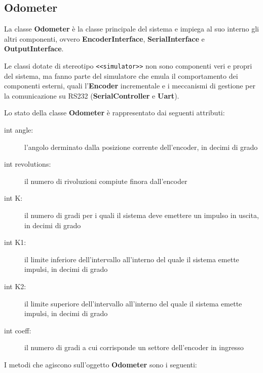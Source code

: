 \documentclass [11pt,a4paper,oneside]{paper}
\newcommand{\component}[1]{\textbf{#1}}
\newcommand{\identifier}[1]{\texttt{#1}}
\begin{document}
\subsection{Odometer}
La classe \component{Odometer} è la classe principale del sistema e
impiega al suo interno gli altri componenti, ovvero 
\component{EncoderInterface}, \component{SerialInterface} e
\component{OutputInterface}.

Le classi dotate di stereotipo \identifier{<<simulator>>} non sono
componenti veri e propri del sistema, ma fanno parte del simulatore
che emula il comportamento dei componenti esterni, quali
l'\component{Encoder} incrementale e i meccanismi di gestione per la
comunicazione su RS232 (\component{SerialController} e \component{Uart}).

Lo stato della classe \component{Odometer} è rappresentato
dai seguenti attributi:

\begin{description}
\item[int angle:] l'angolo derminato dalla posizione corrente dell'encoder,
     in decimi di grado
\item[int revolutions:] il numero di rivoluzioni compiute finora dall'encoder
\item[int K:] il numero di gradi per i quali il sistema deve emettere un
     impulso in uscita, in decimi di grado
\item[int K1:] il limite inferiore dell'intervallo all'interno del quale
     il sistema emette impulsi, in decimi di grado
\item[int K2:] il limite superiore dell'intervallo all'interno del quale
     il sistema emette impulsi, in decimi di grado
\item[int coeff:] il numero di gradi a cui corrisponde un settore
     dell'encoder in ingresso
\end{description}

I metodi che agiscono sull'oggetto \component{Odometer} sono i seguenti:
\end{document}
